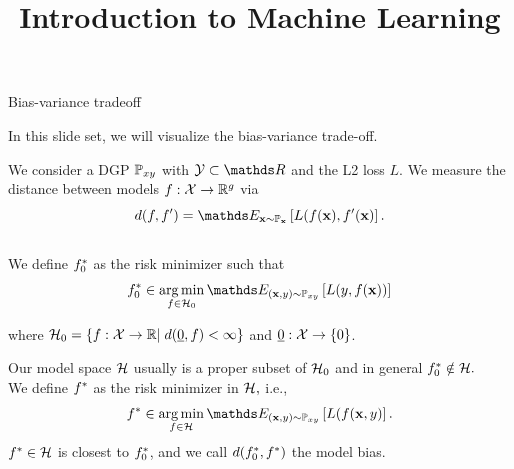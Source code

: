 \documentclass[11pt,compress,t,notes=noshow, xcolor=table]{beamer}
\title{Introduction to Machine Learning}
\begin{document}



\begin{vbframe}{Bias-variance tradeoff}

In this slide set, we will visualize the bias-variance trade-off. \\
\lz 

We consider a DGP $\mathbb{P}_{xy}$ with $\Yspace \subset \R$ and the L2 loss $L$. We measure the distance between models $f:\mathcal{X}\rightarrow\mathbb{R}^g$ via $$d(f, f^\prime) = \E_{\xv\sim\mathbb{P}_{\xv}}\left[L(f(\xv), f^\prime(\xv)\right].$$ \\
\lz
We define $f^{\ast}_0$ as the risk minimizer such that $$\fbayes_0 \in \argmin_{f \in \Hspace_0} \E_{\xy \sim \Pxy}\left[L(y, f(\xv))\right]$$

where $\mathcal{H}_0 = \left\{f:\mathcal{X}\rightarrow\mathbb{R}\vert\; d(\underline{0}, f) < \infty \right\}$ and $\underline{0}:\mathcal{X}\rightarrow\{0\}$.

\framebreak

Our model space $\mathcal{H}$ usually is a proper subset of $\mathcal{H}_0$ and in general $f^{\ast}_0 \notin \mathcal{H}.$\\
We define $f^{\ast}$ as the risk minimizer in $\mathcal{H},$ i.e.,
$$\fbayes \in \argmin_{f \in \Hspace} \E_{\xy \sim \Pxy}\left[L(f(\xv, y)\right].$$
$f^{\ast} \in \mathcal{H}$ is closest to $f^{\ast}_0$, and we call $d(f^{\ast}_0, f^{\ast})$ the model bias.


\end{vbframe}
\end{document}
